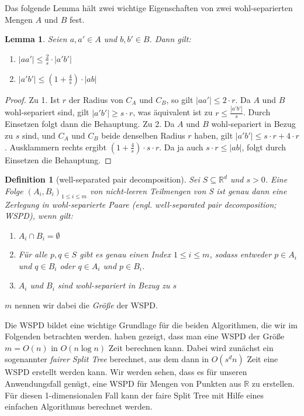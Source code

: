 \documentclass[11pt]{article}
\newcommand{\R}{\mathbb{R}}
\newtheorem{lemma}[theorem]{Lemma}
\newtheorem{definition}[theorem]{Definition}
\begin{document}
    Das folgende Lemma hält zwei wichtige Eigenschaften von zwei wohl-separierten Mengen $A$ und $B$ fest.
    \begin{lemma}
    	\label{lem:wellsep}
		Seien $a, a' \in A$ und $b, b' \in B$. Dann gilt:
		\begin{enumerate}
			\item $\displaystyle |aa'| \leq \frac{2}{s}\cdot|a'b'|$
			\item $\displaystyle |a'b'| \leq (1+\frac{4}{s})\cdot|ab|$
		\end{enumerate}
    \end{lemma}
    \begin{proof}
    	Zu 1. Ist $r$ der Radius von $C_A$ und $C_B$, so gilt $|aa'| \leq 2 \cdot r$. Da $A$ und $B$ wohl-separiert sind, gilt $|a'b'| \geq s \cdot r$, was äquivalent ist zu $r \leq \frac{|a'b'|}{s}$. Durch Einsetzen folgt dann die Behauptung.
    	Zu 2. Da $A$ und $B$ wohl-separiert in Bezug zu $s$ sind, und $C_A$ und $C_B$ beide denselben Radius $r$ haben, gilt $|a'b'| \leq s \cdot r + 4 \cdot r$. Ausklammern rechts ergibt $(1 + \frac{4}{s}) \cdot s \cdot r$. Da ja auch $s \cdot r \leq |ab|$, folgt durch Einsetzen die Behauptung.
    \end{proof}
    
    \begin{definition}[well-separated pair decomposition]
    	\label{def:wspd}
    	Sei $S \subseteq \R^d$ und $s > 0$. Eine Folge $(A_i, B_i)_{1 \leq i \leq m}$ von nicht-leeren Teilmengen von S ist genau dann eine \emph{Zerlegung in wohl-separierte Paare (engl. well-separated pair decomposition; WSPD)}, wenn gilt:
    	\begin{enumerate}[label={(\arabic*)}, itemsep=0mm]
    		\item $A_i \cap B_i = \emptyset$
    		\item Für alle $p, q \in S$ gibt es genau einen Index $1 \leq i \leq m$, sodass entweder $p \in A_i$ und $q \in B_i$ oder $q \in A_i$ und $p \in B_i$.
    		\item $A_i$ und $B_i$ sind wohl-separiert in Bezug zu $s$
    	\end{enumerate}
    \end{definition}
	
	\noindent $m$ nennen wir dabei die \emph{Größe} der WSPD.

	Die WSPD bildet eine wichtige Grundlage für die beiden Algorithmen, die wir im Folgenden betrachten werden. \textellipsis haben gezeigt, dass man eine WSPD der Größe $m = O(n)$ in $O(n\log n)$ Zeit berechnen kann. Dabei wird zunächst ein sogenannter \emph{fairer Split Tree} berechnet, aus dem dann in $O(s^dn)$ Zeit eine WSPD erstellt werden kann. Wir werden sehen, dass es für unseren Anwendungsfall genügt, eine WSPD für Mengen von Punkten aus $\R$ zu erstellen. Für diesen 1-dimensionalen Fall kann der faire Split Tree mit Hilfe eines einfachen Algorithmus berechnet werden.
	
\end{document}
